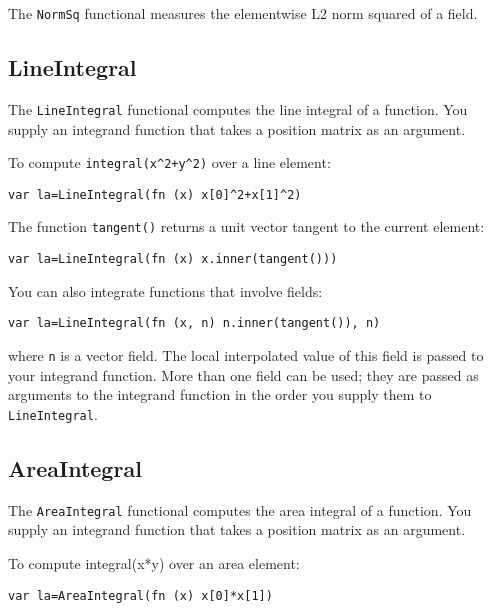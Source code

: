The \texttt{NormSq} functional measures the elementwise L2 norm squared
of a field.

\hypertarget{lineintegral}{%
\subsection{LineIntegral}\label{lineintegral}}

The \texttt{LineIntegral} functional computes the line integral of a
function. You supply an integrand function that takes a position matrix
as an argument.

To compute \texttt{integral(x\^{}2+y\^{}2)} over a line element:

\begin{lstlisting}
var la=LineIntegral(fn (x) x[0]^2+x[1]^2)
\end{lstlisting}

The function \texttt{tangent()} returns a unit vector tangent to the
current element:

\begin{lstlisting}
var la=LineIntegral(fn (x) x.inner(tangent()))
\end{lstlisting}

You can also integrate functions that involve fields:

\begin{lstlisting}
var la=LineIntegral(fn (x, n) n.inner(tangent()), n)
\end{lstlisting}

where \texttt{n} is a vector field. The local interpolated value of this
field is passed to your integrand function. More than one field can be
used; they are passed as arguments to the integrand function in the
order you supply them to \texttt{LineIntegral}.

\hypertarget{areaintegral}{%
\subsection{AreaIntegral}\label{areaintegral}}

The \texttt{AreaIntegral} functional computes the area integral of a
function. You supply an integrand function that takes a position matrix
as an argument.

To compute integral(x*y) over an area element:

\begin{lstlisting}
var la=AreaIntegral(fn (x) x[0]*x[1])
\end{lstlisting}

